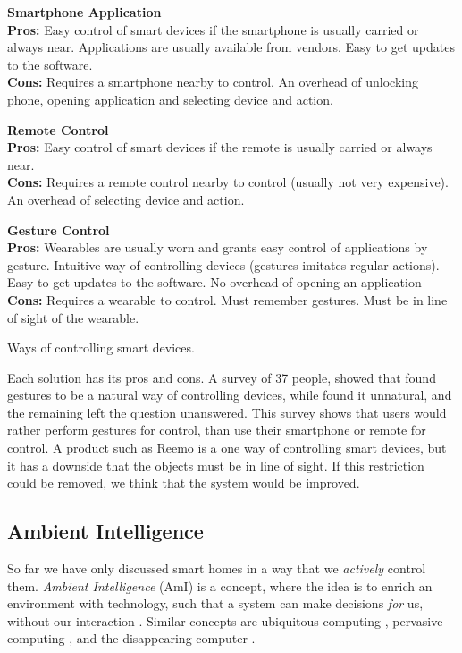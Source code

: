 \begin{table}[!htb]
    \centering
    \parbox[t][][t]{0.3\textwidth}{
        \textbf{Smartphone Application}\\
        \textbf{Pros:} Easy control of smart devices if the smartphone is usually carried or always near. 
                       Applications are usually available from vendors. 
                       Easy to get updates to the software. \\
        \textbf{Cons:} Requires a smartphone nearby to control. 
                       An overhead of unlocking phone, opening application and selecting device and action.
    }\quad
    \parbox[t][][t]{0.3\textwidth}{
        \textbf{Remote Control}\\
        \textbf{Pros:} Easy control of smart devices if the remote is usually carried or always near. \\
        \textbf{Cons:} Requires a remote control nearby to control (usually not very expensive). 
                       An overhead of selecting device and action.
    }\quad
    \parbox[t][][t]{0.3\textwidth}{
        \textbf{Gesture Control}\\
        \textbf{Pros:} Wearables are usually worn and grants easy control of applications by gesture.
                       Intuitive way of controlling devices (gestures imitates regular actions).
                       Easy to get updates to the software. 
                       No overhead of opening an application\\
        \textbf{Cons:} Requires a wearable to control. 
                       Must remember gestures.
                       Must be in line of sight of the wearable.
    }
    \caption{Ways of controlling smart devices.}
    \label{tbl:smartcontrol}
\end{table}

Each solution has its pros and cons. 
A survey \cite{Kela2006} of \num{37} people, 
showed that  found gestures to be a natural way of controlling devices, 
while  found it unnatural, 
and the remaining left the question unanswered. 
This survey shows that users would rather perform gestures for control, 
than use their smartphone or remote for control.  
A product such as Reemo is a one way of controlling smart devices, 
but it has a downside that the objects must be in line of sight. 
If this restriction could be removed, 
we think that the system would be improved.

\subsection{Ambient Intelligence}
So far we have only discussed smart homes in a way that we \emph{actively} control them. 
\emph{Ambient Intelligence} (AmI) is a concept, 
where the idea is to enrich an environment with technology, 
such that a system can make decisions \emph{for} us, 
without our interaction \cite{augusto2007ambient}. 
Similar concepts are ubiquitous computing \cite{Weiser:237456}, pervasive computing \cite{Saha:2003:PCP:642243.642248}, 
and the disappearing computer \cite{Weiser:1999:CSC:329124.329126,Streitz:2005:1047671}. 

